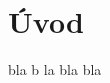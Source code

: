 \documentclass[]{tukediphc}
\begin{document}
\kslovnikterminov
%

\section{Úvod}

bla b la bla bla


%


%


%

%

%

%

%

%

%
\newpage
{}
\protect\label{page:posledna}
\end{document}
